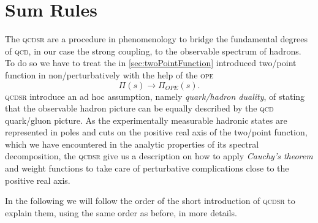 \documentclass[../../index.tex]{subfiles}
\begin{document}
\section{Sum Rules}
\label{sec:sumRules}
The \textsc{qcdsr} are a procedure in phenomenology to bridge the fundamental
degrees of \textsc{qcd}, in our case the strong coupling, to the observable
spectrum of hadrons. To do so we have to treat the in
\cref{sec:twoPointFunction} introduced two\-/point function in
non\-/perturbatively with the help of the \textsc{ope}
\begin{equation}
  \Pi(s) \to \Pi_{OPE}(s).
\end{equation}
\textsc{qcdsr} introduce an ad hoc assumption, namely \textit{quark\-/hadron
  duality}, of stating that the observable hadron picture can be equally
described by the \textsc{qcd} quark\-/gluon picture. As the experimentally
measurable hadronic states are represented in poles and cuts on the positive
real axis of the two\-/point function, which we have encountered in the analytic
properties of its spectral decomposition, the \textsc{qcdsr} give us a
description on how to apply \textit{Cauchy's theorem} and weight functions to
take care of perturbative complications close to the positive real axis.

In the following we will follow the order of the short introduction of
\textsc{qcdsr} to explain them, using the same order as before, in more details.
\end{document}
